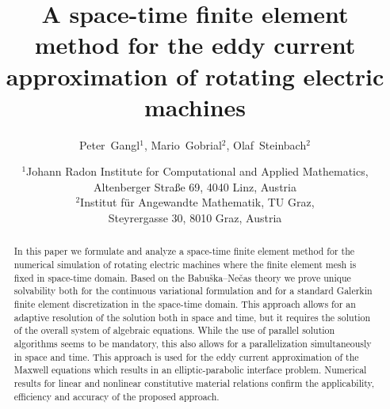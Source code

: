 \documentclass[12pt]{article}
\numberwithin{equation}{section}
\begin{document}
\setcounter{page}{1}

\title{A space-time finite element method for the eddy current
    approximation of rotating electric machines}
\author{Peter~Gangl$^1$, Mario~Gobrial$^2$, Olaf~Steinbach$^2$}
\date{$^1$Johann Radon Institute for Computational and
  Applied Mathematics, \\
Altenberger Stra{\ss}e 69, 4040 Linz, Austria \\[2mm]
$^2$Institut f\"ur Angewandte Mathematik, TU Graz, \\[1mm] 
Steyrergasse 30, 8010 Graz, Austria}

\maketitle

\begin{abstract}
  In this paper we formulate and analyze a space-time finite element
  method for the numerical simulation of rotating electric machines where
  the finite element mesh is fixed in space-time domain.
  Based on the Babu\v{s}ka--Ne\v{c}as theory we prove unique solvability
  both for the continuous variational formulation and for a standard Galerkin
  finite element discretization in the space-time domain. This approach
  allows for an adaptive resolution of the solution both in space and time,
  but it requires the solution of the overall system of algebraic equations.
  While the use of parallel solution algorithms seems to be mandatory,
  this also allows for a parallelization simultaneously in space and time.
  This approach is used for the eddy current approximation of the Maxwell
  equations which results in an elliptic-parabolic interface problem.
  Numerical results for linear and nonlinear constitutive material relations
  confirm the applicability, efficiency and accuracy of the proposed
  approach.
\end{abstract}
\end{document}

